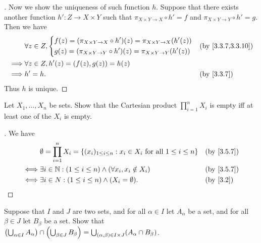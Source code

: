 \begin{proof}[]
	Now we show the uniqueness of such function \(h\).
	Suppose that there exists another function \(h' : Z \to X \times Y\) such that \(\pi_{X \times Y \to X} \circ h' = f\) and \(\pi_{X \times Y \to Y} \circ h' = g\).
	Then we have
	\begin{align*}
		         & \forall z \in Z, \begin{dcases}
			                            f(z) = \pa{\pi_{X \times Y \to X} \circ h'}(z) = \pi_{X \times Y \to X}\pa{h'(z)} \\
			                            g(z) = \pa{\pi_{X \times Y \to Y} \circ h'}(z) = \pi_{X \times Y \to Y}\pa{h'(z)}
		                            \end{dcases} &  & \by{3.3.7,3.3.10}   \\
		\implies & \forall z \in Z, h'(z) = (f(z), g(z)) = h(z)                                                          \\
		\implies & h' = h.                                                                               &  & \by{3.3.7}
	\end{align*}
	Thus \(h\) is unique.
\end{proof}

\begin{ex}\label{ex:3.5.8}
	Let \(X_1, \dots, X_n\) be sets.
	Show that the Cartesian product \(\prod_{i = 1}^n X_i\) is empty iff at least one of the \(X_i\) is empty.
\end{ex}

\begin{proof}[]
	We have
	\begin{align*}
		     & \emptyset = \prod_{i = 1}^n X_i = \set{(x_i)_{1 \leq i \leq n} : x_i \in X_i \text{ for all } 1 \leq i \leq n} &  & \by{3.5.7} \\
		\iff & \exists i \in \N : (1 \leq i \leq n) \land (\forall x_i, x_i \notin X_i)                                       &  & \by{3.5.7} \\
		\iff & \exists i \in N : (1 \leq i \leq n) \land (X_i = \emptyset).                                                   &  & \by{3.2}
	\end{align*}
\end{proof}

\begin{ex}\label{ex:3.5.9}
	Suppose that \(I\) and \(J\) are two sets, and for all \(\alpha \in I\) let \(A_\alpha\) be a set, and for all \(\beta \in J\) let \(B_\beta\) be a set.
	Show that \(\left\lparen\bigcup_{\alpha \in I} A_\alpha\right\rparen \cap \left\lparen\bigcup_{\beta \in J} B_\beta\right\rparen = \bigcup_{(\alpha, \beta) \in I \times J} (A_\alpha \cap B_\beta)\).
\end{ex}

